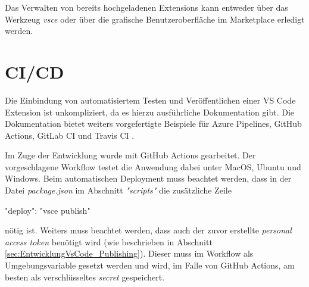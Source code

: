 Das Verwalten von bereits hochgeladenen Extensions kann entweder
über das Werkzeug \emph{vsce} oder über die grafische Benutzeroberfläche
im Marketplace erledigt werden.

\section{CI/CD}
\label{sec:EntwicklungVsCode_CICD}

Die Einbindung von automatisiertem Testen und Veröffentlichen
einer VS Code Extension ist unkompliziert, da es hierzu
ausführliche Dokumentation gibt. Die Dokumentation bietet
weiters vorgefertigte Beispiele für Azure Pipelines, 
GitHub Actions, GitLab CI und Travis CI \cite{VSCodeExtensionAPIContinuousIntegration}.

Im Zuge der Entwicklung wurde mit GitHub Actions gearbeitet.
Der vorgeschlagene Workflow testet die Anwendung dabei unter
MacOS, Ubuntu und Windows. Beim automatischen Deployment muss
beachtet werden, dass in der Datei \emph{package.json} im
Abschnitt \emph{"scripts"} die zusätzliche Zeile
\begin{JsCode}[numbers=none]
"deploy": "vsce publish"
\end{JsCode}
nötig ist. Weiters muss beachtet werden, dass auch der zuvor erstellte 
\emph{personal access token} benötigt wird
(wie beschrieben in Abschnitt \ref{sec:EntwicklungVsCode_Publishing}).
Dieser muss im Workflow als Umgebungsvariable gesetzt werden und
wird, im Falle von GitHub Actions, am besten als verschlüsseltes
\emph{secret} gespeichert.
